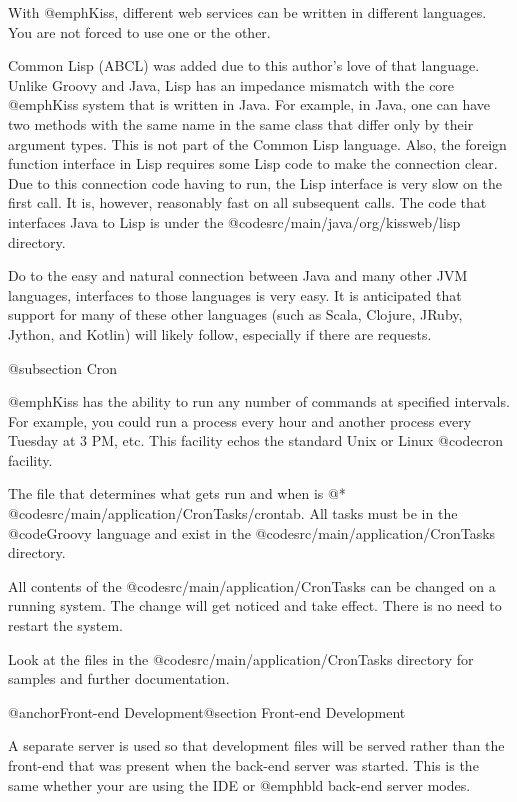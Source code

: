 With @emph{Kiss}, different web services can be written in different
languages.  You are not forced to use one or the other.

Common Lisp (ABCL) was added due to this author's love of that
language.  Unlike Groovy and Java, Lisp has an impedance mismatch with
the core @emph{Kiss} system that is written in Java.  For example, in
Java, one can have two methods with the same name in the same class
that differ only by their argument types.  This is not part of the
Common Lisp language.  Also, the foreign function interface in Lisp
requires some Lisp code to make the connection clear.  Due to this
connection code having to run, the Lisp interface is very slow on the
first call.  It is, however, reasonably fast on all subsequent calls.
The code that interfaces Java to Lisp is under the
@code{src/main/java/org/kissweb/lisp} directory.

Do to the easy and natural connection between Java and many other JVM
languages, interfaces to those languages is very easy.  It is
anticipated that support for many of these other languages (such as
Scala, Clojure, JRuby, Jython, and Kotlin) will likely follow,
especially if there are requests.

@subsection Cron

@emph{Kiss} has the ability to run any number of commands at specified
intervals.  For example, you could run a process every hour and
another process every Tuesday at 3 PM, etc.  This facility echos 
the standard Unix or Linux @code{cron} facility.

The file that determines what gets run and when is @*
@code{src/main/application/CronTasks/crontab}.  All tasks must be in
the @code{Groovy} language and exist in the
@code{src/main/application/CronTasks} directory.

All contents of the @code{src/main/application/CronTasks} can be changed
on a running system.  The change will get noticed and take effect.
There is no need to restart the system.

Look at the files in the @code{src/main/application/CronTasks}
directory for samples and further documentation.

@anchor{Front-end Development}@section Front-end Development

A separate server is used so that development files will be served
rather than the front-end that was present when the back-end server
was started.  This is the same whether your are using the IDE or
@emph{bld} back-end server modes.

